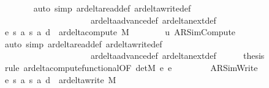 \begin{isabellebody}
\ \ \ \ \ \ \isamarkupfalse%
\ {\isacharparenleft}{\kern0pt}auto\ simp{\isacharcolon}{\kern0pt}\ ar{\isacharunderscore}{\kern0pt}delta{\isacharunderscore}{\kern0pt}read{\isacharunderscore}{\kern0pt}def\ ar{\isacharunderscore}{\kern0pt}delta{\isacharunderscore}{\kern0pt}write{\isacharunderscore}{\kern0pt}def\isanewline
\ \ \ \ \ \ \ \ \ \ \ \ \ \ \ \ \ \ \ \ \ ar{\isacharunderscore}{\kern0pt}delta{\isacharunderscore}{\kern0pt}advance{\isacharunderscore}{\kern0pt}def\ ar{\isacharunderscore}{\kern0pt}delta{\isacharunderscore}{\kern0pt}next{\isacharunderscore}{\kern0pt}def{\isacharparenright}{\kern0pt}\isanewline
\ \ \ \ \isamarkupfalse%
\ e{}{\isacharcolon}{\kern0pt}\ {\isachardoublequoteopen}{\isacharparenleft}{\kern0pt}s{\isacharcomma}{\kern0pt}\ a{\isacharcomma}{\kern0pt}\ s{}{\isacharcomma}{\kern0pt}\ a{}{\isacharcomma}{\kern0pt}\ d{}{\isacharparenright}{\kern0pt}\ {\isasymin}\ ar{\isacharunderscore}{\kern0pt}delta{\isacharunderscore}{\kern0pt}compute\ M{\isachardoublequoteclose}\isanewline
\ \ \ \ \ \ \isamarkupfalse%
\ u{}\ AR{\isacharunderscore}{\kern0pt}SimCompute\isanewline
\ \ \ \ \ \ \isamarkupfalse%
\ {\isacharparenleft}{\kern0pt}auto\ simp{\isacharcolon}{\kern0pt}\ ar{\isacharunderscore}{\kern0pt}delta{\isacharunderscore}{\kern0pt}read{\isacharunderscore}{\kern0pt}def\ ar{\isacharunderscore}{\kern0pt}delta{\isacharunderscore}{\kern0pt}write{\isacharunderscore}{\kern0pt}def\isanewline
\ \ \ \ \ \ \ \ \ \ \ \ \ \ \ \ \ \ \ \ \ ar{\isacharunderscore}{\kern0pt}delta{\isacharunderscore}{\kern0pt}advance{\isacharunderscore}{\kern0pt}def\ ar{\isacharunderscore}{\kern0pt}delta{\isacharunderscore}{\kern0pt}next{\isacharunderscore}{\kern0pt}def{\isacharparenright}{\kern0pt}\isanewline
\ \ \ \ \isamarkupfalse%
\ {\isacharquery}{\kern0pt}thesis\ \isamarkupfalse%
\ {\isacharparenleft}{\kern0pt}rule\ ar{\isacharunderscore}{\kern0pt}delta{\isacharunderscore}{\kern0pt}compute{\isacharunderscore}{\kern0pt}functional{\isacharbrackleft}{\kern0pt}OF\ detM\ e{}\ e{}{\isacharbrackright}{\kern0pt}{\isacharparenright}{\kern0pt}\isanewline
\ \ \isamarkupfalse%
\isanewline
\ \ \ \ \isamarkupfalse%
\ AR{\isacharunderscore}{\kern0pt}SimWrite\isanewline
\ \ \ \ \isamarkupfalse%
\ e{}{\isacharcolon}{\kern0pt}\ {\isachardoublequoteopen}{\isacharparenleft}{\kern0pt}s{\isacharcomma}{\kern0pt}\ a{\isacharcomma}{\kern0pt}\ s{}{\isacharcomma}{\kern0pt}\ a{}{\isacharcomma}{\kern0pt}\ d{}{\isacharparenright}{\kern0pt}\ {\isasymin}\ ar{\isacharunderscore}{\kern0pt}delta{\isacharunderscore}{\kern0pt}write\ M{\isachardoublequoteclose}\isanewline

\end{isabellebody}
